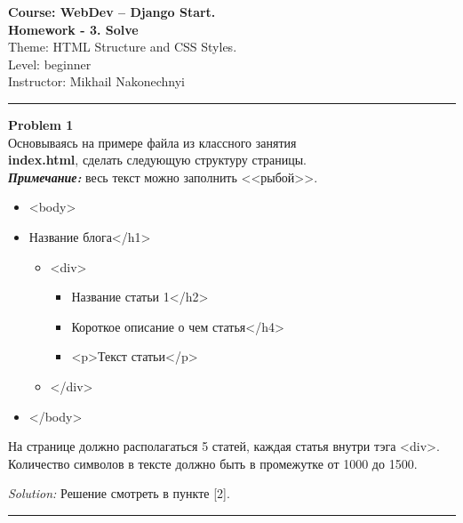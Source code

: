 \documentclass[a4paper, 11pt]{extarticle}
\newenvironment{problem}[2][Problem]
    { \begin{mdframed}[backgroundcolor=gray!20] \textbf{#1 #2} \\}
    {  \end{mdframed}}
\newenvironment{solution}
    {\textit{Solution:}}
    {}
\begin{document}

\noindent \LARGE{\textbf{Course: WebDev -- Django Start.}} \hfill  \\ 
\textbf{Homework - 3. Solve}  \hfill  \\

\noindent Theme: HTML Structure and CSS Styles. \hfill  \\
Level: beginner\\
Instructor: Mikhail Nakonechnyi \\
\noindent\rule{6.257in}{2.8pt}

\begin{problem}{1}
Основываясь на примере файла из классного занятия \\ \textbf{index.html}, сделать следующую структуру страницы. \\
\textit{\textbf{Примечание: }}весь текст можно заполнить <<рыбой>>. 
\begin{itemize}
\item <body>
\item <h1>Название блога</h1>
\begin{itemize}
\item <div>
\begin{itemize}
\item <h2>Название статьи 1</h2>
\item <h4>Короткое описание о чем статья</h4>
\item <p>Текст статьи</p>
\end{itemize}
\item </div>
\end{itemize}
\item </body>
\end{itemize}
На странице должно располагаться 5 статей, каждая статья внутри тэга <div>.
Количество символов в тексте должно быть в промежутке от 1000 до 1500.
\end{problem}
\begin{solution} 
Решение смотреть в пункте [2].

\end{solution} 
\noindent\rule{6.257in}{2.8pt}
\end{document}
